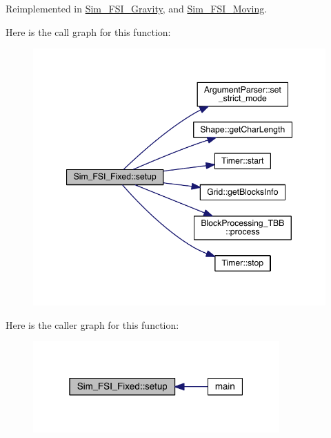 Reimplemented in \hyperlink{class_sim___f_s_i___gravity_a953c04bca39f4c6ace76c307aa00b097}{Sim\+\_\+\+F\+S\+I\+\_\+\+Gravity}, and \hyperlink{class_sim___f_s_i___moving_a0e8ff3c8d37dfa22c3d696c526a14ad8}{Sim\+\_\+\+F\+S\+I\+\_\+\+Moving}.



Here is the call graph for this function\+:\nopagebreak
\begin{figure}[H]
\begin{center}
\leavevmode
\includegraphics[width=347pt]{d8/d3d/class_sim___f_s_i___fixed_a9da9f0d775b05a9a9c77003914af307c_cgraph}
\end{center}
\end{figure}




Here is the caller graph for this function\+:\nopagebreak
\begin{figure}[H]
\begin{center}
\leavevmode
\includegraphics[width=268pt]{d8/d3d/class_sim___f_s_i___fixed_a9da9f0d775b05a9a9c77003914af307c_icgraph}
\end{center}
\end{figure}


